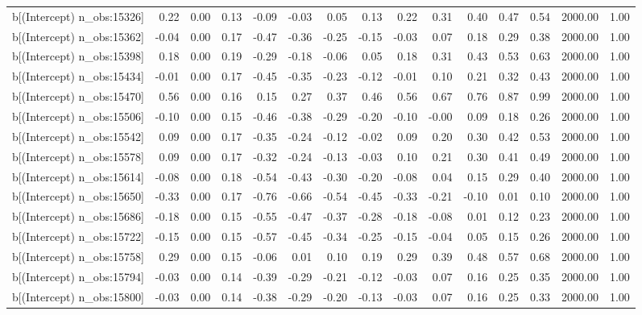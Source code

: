 \begin{table}[ht]
\begin{tabular}{rrrrrrrrrrrrrrr}
  b[(Intercept) n\_obs:15326] & 0.22 & 0.00 & 0.13 & -0.09 & -0.03 & 0.05 & 0.13 & 0.22 & 0.31 & 0.40 & 0.47 & 0.54 & 2000.00 & 1.00 \\ 
  b[(Intercept) n\_obs:15362] & -0.04 & 0.00 & 0.17 & -0.47 & -0.36 & -0.25 & -0.15 & -0.03 & 0.07 & 0.18 & 0.29 & 0.38 & 2000.00 & 1.00 \\ 
  b[(Intercept) n\_obs:15398] & 0.18 & 0.00 & 0.19 & -0.29 & -0.18 & -0.06 & 0.05 & 0.18 & 0.31 & 0.43 & 0.53 & 0.63 & 2000.00 & 1.00 \\ 
  b[(Intercept) n\_obs:15434] & -0.01 & 0.00 & 0.17 & -0.45 & -0.35 & -0.23 & -0.12 & -0.01 & 0.10 & 0.21 & 0.32 & 0.43 & 2000.00 & 1.00 \\ 
  b[(Intercept) n\_obs:15470] & 0.56 & 0.00 & 0.16 & 0.15 & 0.27 & 0.37 & 0.46 & 0.56 & 0.67 & 0.76 & 0.87 & 0.99 & 2000.00 & 1.00 \\ 
  b[(Intercept) n\_obs:15506] & -0.10 & 0.00 & 0.15 & -0.46 & -0.38 & -0.29 & -0.20 & -0.10 & -0.00 & 0.09 & 0.18 & 0.26 & 2000.00 & 1.00 \\ 
  b[(Intercept) n\_obs:15542] & 0.09 & 0.00 & 0.17 & -0.35 & -0.24 & -0.12 & -0.02 & 0.09 & 0.20 & 0.30 & 0.42 & 0.53 & 2000.00 & 1.00 \\ 
  b[(Intercept) n\_obs:15578] & 0.09 & 0.00 & 0.17 & -0.32 & -0.24 & -0.13 & -0.03 & 0.10 & 0.21 & 0.30 & 0.41 & 0.49 & 2000.00 & 1.00 \\ 
  b[(Intercept) n\_obs:15614] & -0.08 & 0.00 & 0.18 & -0.54 & -0.43 & -0.30 & -0.20 & -0.08 & 0.04 & 0.15 & 0.29 & 0.40 & 2000.00 & 1.00 \\ 
  b[(Intercept) n\_obs:15650] & -0.33 & 0.00 & 0.17 & -0.76 & -0.66 & -0.54 & -0.45 & -0.33 & -0.21 & -0.10 & 0.01 & 0.10 & 2000.00 & 1.00 \\ 
  b[(Intercept) n\_obs:15686] & -0.18 & 0.00 & 0.15 & -0.55 & -0.47 & -0.37 & -0.28 & -0.18 & -0.08 & 0.01 & 0.12 & 0.23 & 2000.00 & 1.00 \\ 
  b[(Intercept) n\_obs:15722] & -0.15 & 0.00 & 0.15 & -0.57 & -0.45 & -0.34 & -0.25 & -0.15 & -0.04 & 0.05 & 0.15 & 0.26 & 2000.00 & 1.00 \\ 
  b[(Intercept) n\_obs:15758] & 0.29 & 0.00 & 0.15 & -0.06 & 0.01 & 0.10 & 0.19 & 0.29 & 0.39 & 0.48 & 0.57 & 0.68 & 2000.00 & 1.00 \\ 
  b[(Intercept) n\_obs:15794] & -0.03 & 0.00 & 0.14 & -0.39 & -0.29 & -0.21 & -0.12 & -0.03 & 0.07 & 0.16 & 0.25 & 0.35 & 2000.00 & 1.00 \\ 
  b[(Intercept) n\_obs:15800] & -0.03 & 0.00 & 0.14 & -0.38 & -0.29 & -0.20 & -0.13 & -0.03 & 0.07 & 0.16 & 0.25 & 0.33 & 2000.00 & 1.00 \\ 

\end{tabular}
\end{table}
